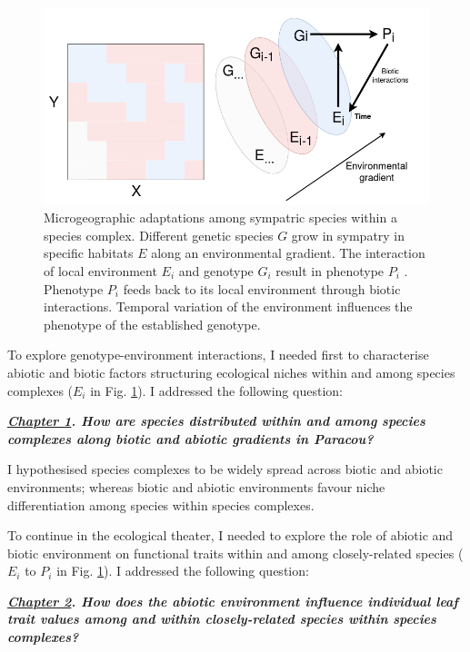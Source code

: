 \documentclass[12pt,twoside,a4paper, a]{article}
\begin{document}
\begin{figure}[H]

{\centering \includegraphics[width=\linewidth]{figures/phdscheme} 

}

\caption{Microgeographic adaptations among sympatric species within a species complex. Different genetic species $G$ grow in sympatry in specific habitats $E$ along an environmental gradient. The interaction of local environment $E_i$ and genotype $G_i$ result in phenotype $P_i$ . Phenotype $P_i$ feeds back to its local environment through biotic interactions. Temporal variation of the environment influences the phenotype of the established genotype.}\label{fig:phdscheme}
\end{figure}

To explore genotype-environment interactions, I needed first to characterise abiotic and biotic factors structuring ecological niches within and among species complexes (\(E_i\) in Fig. \ref{fig:phdscheme}).
I addressed the following question:

\textbf{\emph{\protect\hyperlink{Ch1}{Chapter 1}. How are species distributed within and among species complexes along biotic and abiotic gradients in Paracou?}}

I hypothesised species complexes to be widely spread across biotic and abiotic environments; whereas biotic and abiotic environments favour niche differentiation among species within species complexes.

To continue in the ecological theater, I needed to explore the role of abiotic and biotic environment on functional traits within and among closely-related species (\(E_i\) to \(P_i\) in Fig. \ref{fig:phdscheme}).
I addressed the following question:

\textbf{\emph{\protect\hyperlink{Ch2}{Chapter 2}. How does the abiotic environment influence individual leaf trait values among and within closely-related species within species complexes?}}
\end{document}
